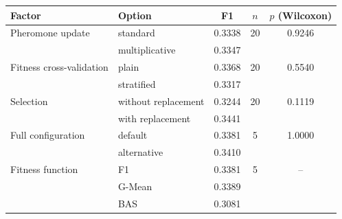 \begin{tabular}{llccc}
\toprule
Factor & Option & F1 & $n$ & $p$ (Wilcoxon) \\
\midrule
Pheromone update & standard & 0.3338 & 20 & 0.9246 \\
 & multiplicative & 0.3347 &  &  \\
Fitness cross-validation & plain & 0.3368 & 20 & 0.5540 \\
 & stratified & 0.3317 &  &  \\
Selection & without replacement & 0.3244 & 20 & 0.1119 \\
 & with replacement & 0.3441 &  &  \\
Full configuration & default & 0.3381 & 5 & 1.0000 \\
 & alternative & 0.3410 &  &  \\
\midrule
Fitness function & F1 & 0.3381 & 5 & -- \\
 & G-Mean & 0.3389 &  &  \\
 & BAS & 0.3081 &  &  \\
\bottomrule
\end{tabular}
